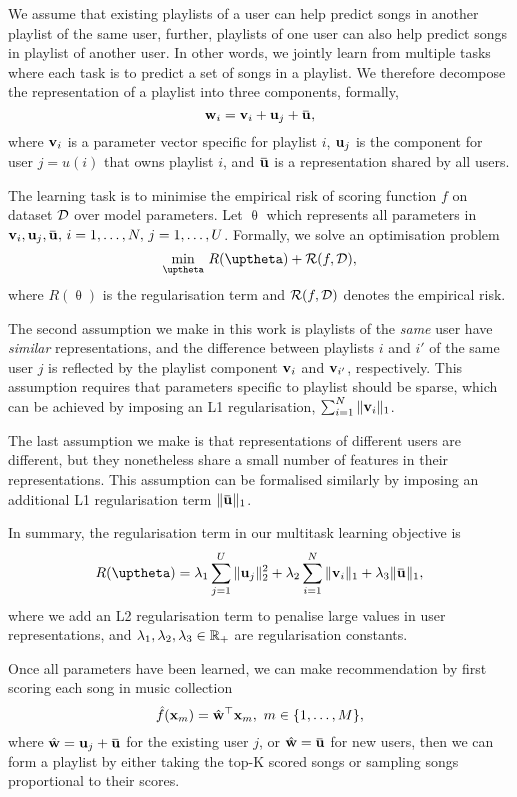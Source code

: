 We assume that existing playlists of a user can help predict songs in another playlist of the same user,
further, playlists of one user can also help predict songs in playlist of another user.
In other words, we jointly learn from multiple tasks where each task is to predict a set of songs in a playlist.
We therefore decompose the representation of a playlist into three components, formally,
$$
\w_i = \bv_i + \bu_j + \widebar\bu,
$$
where $\mathbf{v}_i$ is a parameter vector specific for playlist $i$,
$\mathbf{u}_j$ is the component for user $j=u(i)$ that owns playlist $i$,
and $\widebar\bu$ is a representation shared by all users.


%
The learning task is to minimise the empirical risk of scoring function $f$ on dataset $\mathcal{D}$ over model parameters.
Let $\uptheta$ which represents all parameters in $\bv_i, \bu_j, \widebar\bu, \, i=1,\dots,N, \, j=1,\dots,U$.
Formally, we solve an optimisation problem
\begin{equation}
\label{eq:obj}
\min_{\uptheta} \, R(\uptheta) + \RCal(f, \DCal),
\end{equation}
where $R(\uptheta)$ is the regularisation term and $\mathcal{R}(f, \mathcal{D})$ denotes the empirical risk.

The second assumption we make in this work is playlists of the \emph{same} user have \emph{similar} representations,
and the difference between playlists $i$ and $i'$ of the same user $j$ is reflected by the playlist component $\mathbf{v}_i$
and $\mathbf{v}_{i'}$, respectively.
This assumption requires that parameters specific to playlist should be sparse,
which can be achieved by imposing an L1 regularisation, \ie $\sum_{i=1}^N \| \mathbf{v}_i \|_1$.

The last assumption we make is that representations of different users are different,
but they nonetheless share a small number of features in their representations.
This assumption can be formalised similarly by imposing an additional L1 regularisation term $\| \widebar\bu \|_1$.

In summary, the regularisation term in our multitask learning objective is
\begin{equation*}
R(\uptheta) = \lambda_1 \sum_{j=1}^U \|\bu_j\|_2^2 + \lambda_2 \sum_{i=1}^N \|\bv_i\|_1 + \lambda_3 \|\widebar\bu\|_1,
\end{equation*}
where we add an L2 regularisation term to penalise large values in user representations,
and $\lambda_1, \lambda_2, \lambda_3 \in \mathbb{R}_+$ are regularisation constants.

Once all parameters have been learned, we can make recommendation by first scoring each song in music collection
$$
\hat f(\mathbf{x}_m) = \hat {\mathbf{w}}^\top \mathbf{x}_m, \ m \in \{1,\dots,M\},
$$
where $\hat\w = \bu_j + \widebar\bu$ for the existing user $j$, or $\hat\w = \widebar\bu$ for new users,
then we can form a playlist by either taking the top-K scored songs or sampling songs proportional to their scores.
